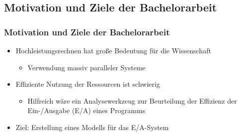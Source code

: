 \documentclass{beamer}
\begin{document}
\subsection{Motivation und Ziele der Bachelorarbeit}
\begin{frame}
\frametitle{Motivation und Ziele der Bachelorarbeit}
	\begin{itemize}
		\item Hochleistungsrechnen hat große Bedeutung für die Wissenschaft
	\begin{itemize}
		\item Verwendung massiv paralleler Systeme
	\end{itemize}	
	\item Effiziente Nutzung der Ressourcen ist schwierig
	\begin{itemize}
		\item Hilfreich wäre ein Analysewerkzeug zur Beurteilung der Effizienz der Ein-/Ausgabe (E/A) eines Programms
	\end{itemize}			
\end{itemize}
	\begin{itemize}
		\item Ziel: Erstellung eines Modells für das E/A-System
	\end{itemize}	
\end{frame}
\end{document}
